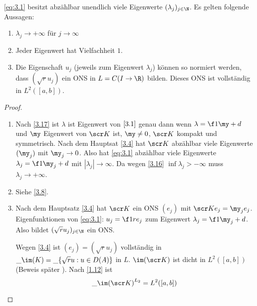 \begin{st} \label{3.19}
	\eqref{eq:3.1} besitzt abzählbar unendlich viele Eigenwerte $(\lambda_j)_{j\in \N}$.
	Es gelten folgende Aussagen:
	\begin{enumerate}[1)]
		\item
			$\lambda_j \to + \infty$ für $j \to \infty$
		\item
			Jeder Eigenwert hat Vielfachheit $1$.
		\item
			Die Eigenschaft $u_j$ (jeweils zum Eigenwert $\lambda_j$) können so normiert werden, dass $(\sqrt {r} u_j)$ ein ONS in $L = C(I \to \R)$ bilden.
			Dieses ONS ist vollständig in $L^2([a,b])$.
	\end{enumerate}
	\begin{proof}
		\begin{enumerate}[1)]
			\item
				Nach \ref{3.17} ist $\lambda$ ist Eigenwert von $\eqref{3.1}$ genau dann wenn $\lambda = \f 1\my + d$ und $\my$ Eigenwert von $\scr K$ ist, $\my \neq 0$, $\scr K$ kompakt und symmetrisch.
				Nach dem Hauptsat \ref{3.4} hat $\scr K$ abzählbar viele Eigenwerte $(\my_j)$ mit $\my_j \to 0$.
				Also hat \eqref{eq:3.1} abzählbar viele Eigenwerte $\lambda_j = \f 1{\my_j} + d$ mit $|\lambda_j| \to \infty$.
				Da wegen \ref{3.16}  $\inf \lambda_j > -\infty$ muss $\lambda_j \to + \infty$.
			\item
				Siehe \ref{3.8}.
			\item
				Nach dem Hauptsatz \ref{3.4} hat $\scr K$ ein ONS $(e_j)$ mit $\scr K e_j = \my_j e_j$.
				Eigenfunktionen von \eqref{eq:3.1}: $u_j = \f 1{r} e_j$ zum Eigenwert $\lambda_j = \f 1{\my_j} + d$.
				Also bildet $(\sqrt{r}u_j)_{j\in \N}$ ein ONS.

				Wegen \ref{3.4} ist $(e_j) = (\sqrt{r} u_j)$ vollständig in $\_{\im (K)} = \_{\{\sqrt{r} u : u  \in D(A) \}}$ in $L$.
				$\im (\scr K)$ ist dicht in $L^2([a,b])$ (Beweis später \fixme[Referenz]).
				Nach \ref{1.12} ist
				\[
					\_{\im(\scr K)}^{L_2} = L^2 ([a,b])
				\]
		\end{enumerate}
	\end{proof}
\end{st}


